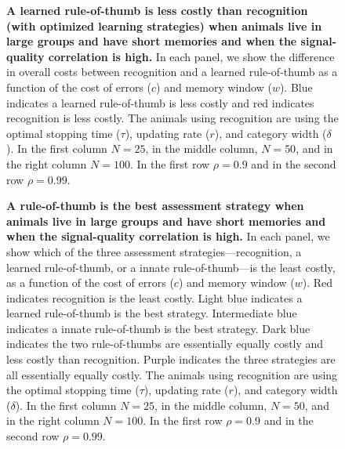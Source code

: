 \begin{figure}
\caption{\sffamily\small\textbf{A learned rule-of-thumb is less costly than recognition (with optimized learning strategies) when animals live in large groups and have short memories and when the signal-quality correlation is high.} In each panel, we show the difference in overall costs between recognition and a learned rule-of-thumb as a function of the cost of errors ($c$) and memory window ($w$). Blue indicates a learned rule-of-thumb is less costly and red indicates recognition is less costly. The animals using recognition are using the optimal stopping time ($\tau$), updating rate ($r$), and category width ($\delta$). In the first column $N=25$, in the middle column, $N=50$, and in the right column $N=100$. In the first row $\rho=0.9$ and in the second row $\rho=0.99$.}
\label{comparison}
\end{figure}

\begin{figure}
\caption{\sffamily\small\textbf{A rule-of-thumb is the best assessment strategy when animals live in large groups and have short memories and when the signal-quality correlation is high.} In each panel, we show which of the three assessment strategies---recognition, a learned rule-of-thumb, or a innate rule-of-thumb---is the least costly, as a function of the cost of errors ($c$) and memory window ($w$). Red indicates recognition is the least costly. Light blue indicates a learned rule-of-thumb is the best strategy. Intermediate blue indicates a innate rule-of-thumb is the best strategy. Dark blue indicates the two rule-of-thumbs are essentially equally costly and less costly than recognition. Purple indicates the three strategies are all essentially equally costly. The animals using recognition are using the optimal stopping time ($\tau$), updating rate ($r$), and category width ($\delta$). In the first column $N=25$, in the middle column, $N=50$, and in the right column $N=100$. In the first row $\rho=0.9$ and in the second row $\rho=0.99$.}
\label{best}
\end{figure}

